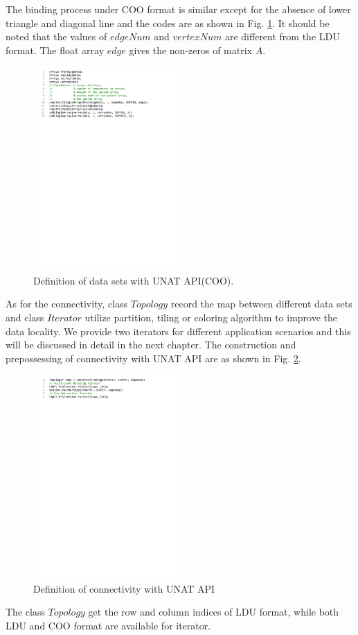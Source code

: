 \documentclass[5p,times]{elsarticle}
\begin{document}
The binding process under COO format is similar except for the absence of lower triangle and diagonal line and the codes are as shown in Fig. \ref{dataset-coo}. It should be noted that the values of $edgeNum$ and $vertexNum$ are different from the LDU format. The float array $edge$ gives the non-zeros of matrix $A$.

\begin{figure}[htbp]
	\centerline{\includegraphics[width=0.49\textwidth]{data-set-coo.pdf}}
	\caption{Definition of data sets with UNAT API(COO).}
	\label{dataset-coo}
\end{figure}

As for the connectivity, class $Topology$ record the map between different data sets and class $Iterator$ utilize partition, tiling or coloring algorithm to improve the data locality. We provide two iterators for different application scenarios and this will be discussed in detail in the next chapter. The construction and prepossessing of connectivity with UNAT API are as shown in Fig. \ref{connectivity}.
\begin{figure}[htbp]
	\centerline{\includegraphics[width=0.49\textwidth]{connectivity.pdf}}
	\caption{Definition of connectivity with UNAT API}
	\label{connectivity}
\end{figure}
The class $Topology$ get the row and column indices of LDU format, while both LDU and COO format are available for iterator.
\end{document}

